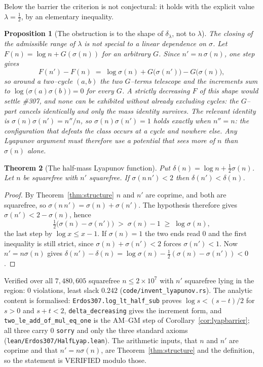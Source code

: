 \documentclass[11pt]{article}
\newtheorem{theorem}{Theorem}[section]
\newtheorem{proposition}[theorem]{Proposition}
\theoremstyle{definition}
\begin{document}
Below the barrier the criterion is not conjectural: it holds with the explicit value
$\lambda=\tfrac12$, by an elementary inequality.

\begin{proposition}[The obstruction is to the shape of $\delta_\lambda$, not to $\lambda$]\label{prop:lyapshape}
The closing of the admissible range of $\lambda$ is not special to a linear dependence on $\sigma$.
Let $F(n)=\log n+G(\sigma(n))$ for an arbitrary $G$. Since $n'=n\,\sigma(n)$, one step gives
\[ F(n')-F(n)\;=\;\log\sigma(n)+G\bigl(\sigma(n')\bigr)-G\bigl(\sigma(n)\bigr), \]
so around a two--cycle $(a,b)$ the two $G$--terms telescope and the increments sum to
$\log\bigl(\sigma(a)\sigma(b)\bigr)=0$ for \emph{every} $G$. A strictly decreasing $F$ of this shape
would settle \#307, and none can be exhibited without already excluding cycles: the $G$--part
cancels identically and only the mass identity survives. The relevant identity is
$\sigma(n)\sigma(n')=n''/n$, so $\sigma(n)\sigma(n')=1$ holds exactly when $n''=n$: the configuration
that defeats the class occurs at a cycle and nowhere else. Any Lyapunov argument must therefore use a
potential that sees more of $n$ than $\sigma(n)$ alone.
\end{proposition}

\begin{theorem}[The half-mass Lyapunov function]\label{thm:halflyap}
Put $\delta(n)=\log n+\tfrac12\sigma(n)$. Let $n$ be squarefree with $n'$ squarefree. If
$\sigma(n\,n')<2$ then $\delta(n')<\delta(n)$.
\end{theorem}
\begin{proof}
By Theorem~\ref{thm:structure} $n$ and $n'$ are coprime, and both are squarefree, so
$\sigma(n\,n')=\sigma(n)+\sigma(n')$. The hypothesis therefore gives $\sigma(n')<2-\sigma(n)$, hence
\[ \tfrac12\bigl(\sigma(n)-\sigma(n')\bigr)\;>\;\sigma(n)-1\;\ge\;\log\sigma(n), \]
the last step by $\log x\le x-1$. If $\sigma(n)=1$ the two ends read $0$ and the first inequality is
still strict, since $\sigma(n)+\sigma(n')<2$ forces $\sigma(n')<1$. Now $n'=n\sigma(n)$ gives
$\delta(n')-\delta(n)=\log\sigma(n)-\tfrac12(\sigma(n)-\sigma(n'))<0$.
\end{proof}
Verified over all $7{,}480{,}605$ squarefree $n\le2\times10^7$ with $n'$ squarefree lying in the
region: $0$ violations, least slack $0.242$ \textup{(\texttt{code/invent\_lyapunov.rs})}. The analytic content is formalised:
\texttt{Erdos307.log\_lt\_half\_sub} proves $\log s<(s-t)/2$ for $s>0$ and $s+t<2$,
\texttt{delta\_decreasing} gives the increment form, and
\texttt{two\_le\_add\_of\_mul\_eq\_one} is the \textup{AM--GM} step of
Corollary~\ref{cor:lyapbarrier}; all three carry $0$ \texttt{sorry} and only the three standard
axioms \textup{(\texttt{lean/Erdos307/HalfLyap.lean})}. The arithmetic inputs, that $n$ and $n'$ are
coprime and that $n'=n\sigma(n)$, are Theorem~\ref{thm:structure} and the definition, so the
statement is \textup{VERIFIED} modulo those.
\end{document}
